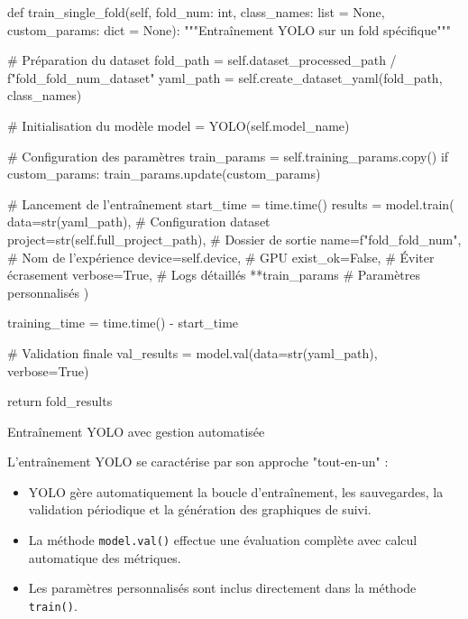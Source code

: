 \begin{code}[H]
    \begin{pythoncode}
        def train_single_fold(self, fold_num: int, class_names: list = None,
                            custom_params: dict = None):
            """Entraînement YOLO sur un fold spécifique"""
            
            # Préparation du dataset
            fold_path = self.dataset_processed_path / f"fold_{fold_num}_dataset"
            yaml_path = self.create_dataset_yaml(fold_path, class_names)
            
            # Initialisation du modèle
            model = YOLO(self.model_name)
            
            # Configuration des paramètres
            train_params = self.training_params.copy()
            if custom_params:
                train_params.update(custom_params)
            
            # Lancement de l'entraînement
            start_time = time.time()
            results = model.train(
                data=str(yaml_path),              # Configuration dataset
                project=str(self.full_project_path),  # Dossier de sortie
                name=f"fold_{fold_num}",          # Nom de l'expérience
                device=self.device,               # GPU
                exist_ok=False,                   # Éviter écrasement
                verbose=True,                     # Logs détaillés
                **train_params                    # Paramètres personnalisés
            )
            
            training_time = time.time() - start_time
            
            # Validation finale
            val_results = model.val(data=str(yaml_path), verbose=True)
            
            return fold_results
    \end{pythoncode}
    \caption{Entraînement YOLO avec gestion automatisée}
    \label{code:ch36_entrainement_yolo}
\end{code}

L'entraînement YOLO se caractérise par son approche "tout-en-un" :
\begin{itemize}
    \item YOLO gère automatiquement la boucle d'entraînement, les sauvegardes, la validation périodique et la génération des graphiques de suivi.
    \item La méthode \texttt{model.val()} effectue une évaluation complète avec calcul automatique des métriques.
    \item Les paramètres personnalisés sont inclus directement dans la méthode \texttt{train()}.
\end{itemize}

